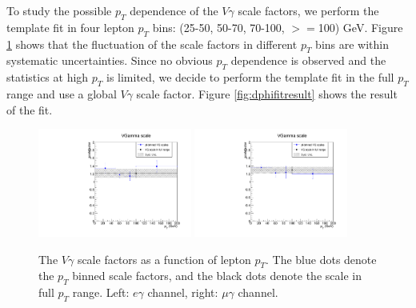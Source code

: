 \documentclass[thesis.tex]{subfiles}
\renewcommand\_{\textunderscore\allowbreak}
\begin{document}
To study the possible $p_T$ dependence of the $V\gamma$ scale factors, we perform the template fit in four lepton $p_T$ bins: (25-50, 50-70, 70-100, $>=$100) GeV. Figure \ref{fig:dphiptdependence} shows that the fluctuation of the scale factors in different $p_T$ bins are within systematic uncertainties. Since no obvious $p_T$ dependence is observed and the statistics at high $p_T$ is limited, we decide to perform the template fit in the full $p_T$ range and use a global $V\gamma$ scale factor. Figure \ref{fig:dphifitresult} shows the result of the fit. 
\begin{figure}
  \centering
    \includegraphics[width=0.45\textwidth]{Figures/scale_ptDependence_eg.pdf}
    \includegraphics[width=0.45\textwidth]{Figures/scale_ptDependence_mg.pdf}
  \caption{The $V\gamma$ scale factors as a function of lepton $p_T$. The blue dots denote the $p_T$ binned scale factors, and the black dots denote the scale in full $p_T$ range. Left: $e\gamma$ channel, right: $\mu\gamma$ channel. }
    \label{fig:dphiptdependence}
\end{figure}
\end{document}
